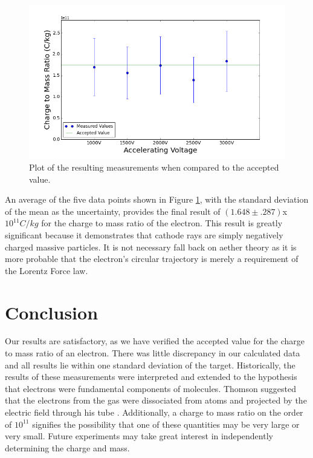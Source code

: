 \documentclass[12pt]{article}
\begin{document}
\begin{figure}[h!]
  \centering
  \includegraphics[width=1\textwidth]{Results.png}
  \caption{Plot of the resulting measurements when compared to the accepted value.}
\label{Results}
\end{figure}

An average of the five data points shown in Figure \ref{Results}, with the standard deviation of the mean as the uncertainty, provides the final result of $(1.648 \pm .287)$x$10^{11} C/kg$ for the charge to mass ratio of the electron. This result is greatly significant because it demonstrates that cathode rays are simply negatively charged massive particles. It is not necessary fall back on aether theory as it is more probable that the electron's circular trajectory is merely a requirement of the Lorentz Force law.



	
        
\section{Conclusion}
Our results are satisfactory, as we have verified the accepted value for the charge to mass ratio of an electron. There was little discrepancy in our calculated data and all results lie within one standard deviation of the target. Historically, the results of these measurements were interpreted and extended to the hypothesis that electrons were fundamental components of molecules. Thomson suggested that the electrons from the gas were dissociated from atoms and projected by the electric field through his tube \cite{Thomson2010CathodeRays}. Additionally, a charge to mass ratio on the order of $10^{11}$ signifies the possibility that one of these quantities may be very large or very small. Future experiments may take great interest in independently determining the charge and mass.



\end{document}
